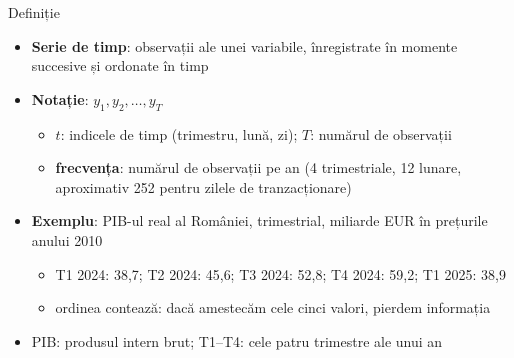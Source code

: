 \begin{frame}{Definiție}
\itemsize{\small}
\begin{itemize}
    \item \textbf{Serie de timp}: observații ale unei variabile, înregistrate în momente succesive și ordonate în timp
    \item \textbf{Notație}: $y_1, y_2, \ldots, y_T$
    \begin{itemize}
        \item $t$: indicele de timp (trimestru, lună, zi); $T$: numărul de observații
        \item \textbf{frecvența}: numărul de observații pe an (4 trimestriale, 12 lunare, aproximativ 252 pentru zilele de tranzacționare)
    \end{itemize}
    \item \textbf{Exemplu}: PIB-ul real al României, trimestrial, miliarde EUR în prețurile anului 2010
    \begin{itemize}
        \item T1 2024: 38{,}7; T2 2024: 45{,}6; T3 2024: 52{,}8; T4 2024: 59{,}2; T1 2025: 38{,}9
        \item ordinea contează: dacă amestecăm cele cinci valori, pierdem informația
    \end{itemize}
    \item PIB: produsul intern brut; T1--T4: cele patru trimestre ale unui an
\end{itemize}
\end{frame}

